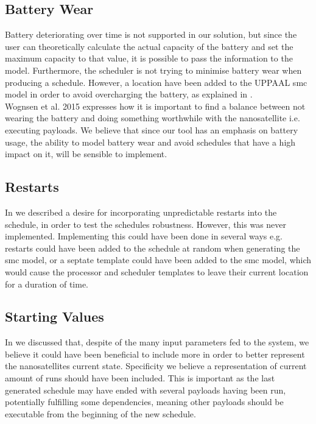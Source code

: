 \subsection*{Battery Wear}
Battery deteriorating over time is not supported in our solution, but since the user can theoretically calculate the actual capacity of the battery and set the maximum capacity to that value, it is possible to pass the information to the model. Furthermore, the scheduler is not trying to minimise battery wear when producing a schedule. However, a location have been added to the UPPAAL \gls{smc} model in order to avoid overcharging the battery, as explained in .\\
Wognsen et al. 2015\cite{score_function} expresses how it is important to find a balance between not wearing the battery and doing something worthwhile with the nanosatellite i.e. executing payloads. We believe that since our tool has an emphasis on battery usage, the ability to model battery wear and avoid schedules that have a high impact on it, will be sensible to implement. 

\subsection*{Restarts}
In  we described a desire for incorporating unpredictable restarts into the schedule, in order to test the schedules robustness. However, this was never implemented. Implementing this could have been done in several ways e.g. restarts could have been added to the schedule at random when generating the \gls{smc} model, or a septate template could have been added to the \gls{smc} model, which would cause the processor and scheduler templates to leave their current location for a duration of time.

\subsection*{Starting Values} \label{ssec:start_val}
In  we discussed that, despite of the many input parameters fed to the system, we believe it could have been beneficial to include more in order to better represent the nanosatellites current state. Specificity we believe a representation of current amount of runs should have been included. This is important as the last generated schedule may have ended with several payloads having been run, potentially fulfilling some dependencies, meaning other payloads should be executable from the beginning of the new schedule.

